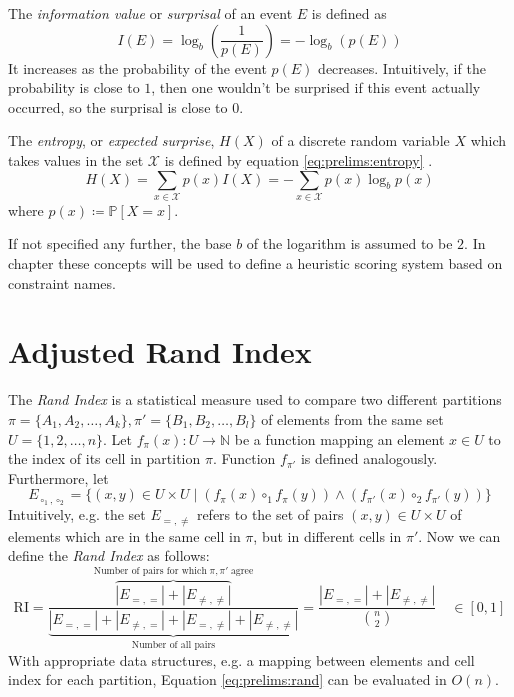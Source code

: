 		The \textit{information value} or \textit{surprisal} of an event $E$ is defined as
		\begin{equation}
			I(E) = \log_b \left( \frac{1}{p(E)} \right) = - \log_b \left( p(E) \right)
		\end{equation}
		It increases as the probability of the event $p(E)$ decreases.
		Intuitively, if the probability is close to $1$, then one wouldn't be surprised if this event actually occurred, so the surprisal is close to $0$.
		
		The \textit{entropy}, or \textit{expected surprise}, $H(X)$ of a discrete random variable $X$ which takes values in the set $\mathcal{X}$ is defined by equation \ref{eq:prelims:entropy} \cite{coverElementsInformationTheory2006}.
		\begin{equation}
		\label{eq:prelims:entropy}
			H(X) =  \sum_{x \in \mathcal{X}} p(x) I(X) = - \sum_{x \in \mathcal{X}} p(x) \log_b p(x)
		\end{equation}
		where $p(x) \coloneq \mathbb{P}[X = x]$.
		
		If not specified any further, the base $b$ of the logarithm is assumed to be $2$.
		In chapter  these concepts will be used to define a heuristic scoring system based on constraint names.
		
	\section{Adjusted Rand Index}
	\label{chap:prelims:rand}
	
		The \textit{Rand Index} is a statistical measure used to compare two different partitions $\pi = \{ A_1, A_2, \ldots, A_k \}, \pi' = \{ B_1, B_2, \ldots, B_l \}$ of elements from the same set $U = \{ 1, 2, \ldots, n \}$.
		Let $f_\pi(x): U \rightarrow \mathbb{N}$ be a function mapping an element $x \in U$ to the index of its cell in partition $\pi$. Function $f_{\pi'}$ is defined analogously.
		Furthermore, let
		\begin{equation*}
			E_{\circ_1, \circ_2} = \{ (x, y) \in U \times U \mid (f_\pi(x) \circ_1 f_\pi(y)) \land (f_{\pi'}(x) \circ_2 f_{\pi'}(y)) \}
		\end{equation*}
		Intuitively, e.g. the set $E_{=, \not=}$ refers to the set of pairs $(x, y) \in U \times U$ of elements which are in the same cell in $\pi$, but in different cells in $\pi'$.
		Now we can define the \textit{Rand Index} as follows:
		\begin{equation}
			\label{eq:prelims:rand}
			\mathrm{RI} = \frac{\overbrace{|E_{=, =}| + |E_{\not=, \not=}|}^{\text{Number of pairs for which}\; \pi, \pi' \;\text{agree}}}{\underbrace{|E_{=, =}| + |E_{\not=, =}| + |E_{=, \not=}| + |E_{\not=, \not=}|}_{\text{Number of all pairs}}} = \frac{|E_{=, =}| + |E_{\not=, \not=}|}{\binom{n}{2}} \quad \in [0, 1]
		\end{equation}
		With appropriate data structures, e.g. a mapping between elements and cell index for each partition, Equation \ref{eq:prelims:rand} can be evaluated in $O(n)$.
		

